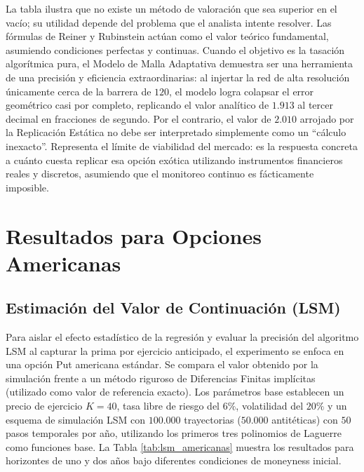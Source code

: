 La tabla ilustra que no existe un método de valoración que sea superior en el vacío; su utilidad depende del problema que el analista intente resolver. Las fórmulas de Reiner y Rubinstein actúan como el valor teórico fundamental, asumiendo condiciones perfectas y continuas. Cuando el objetivo es la tasación algorítmica pura, el Modelo de Malla Adaptativa demuestra ser una herramienta de una precisión y eficiencia extraordinarias: al injertar la red de alta resolución únicamente cerca de la barrera de $120$, el modelo logra colapsar el error geométrico casi por completo, replicando el valor analítico de $1.913$ al tercer decimal en fracciones de segundo.
Por el contrario, el valor de $2.010$ arrojado por la Replicación Estática no debe ser interpretado simplemente como un ``cálculo inexacto''. Representa el límite de viabilidad del mercado: es la respuesta concreta a cuánto cuesta replicar esa opción exótica utilizando instrumentos financieros reales y discretos, asumiendo que el monitoreo continuo es fácticamente imposible.

\section{Resultados para Opciones Americanas}
\label{sec:resultados_americanas}

\subsection{Estimación del Valor de Continuación (LSM)}

Para aislar el efecto estadístico de la regresión y evaluar la precisión del algoritmo LSM al capturar la prima por ejercicio anticipado, el experimento se enfoca en una opción Put americana estándar. Se compara el valor obtenido por la simulación frente a un método riguroso de Diferencias Finitas implícitas (utilizado como valor de referencia exacto).
Los parámetros base establecen un precio de ejercicio $K=40$, tasa libre de riesgo del $6\%$, volatilidad del $20\%$ y un esquema de simulación LSM con $100.000$ trayectorias ($50.000$ antitéticas) con $50$ pasos temporales por año, utilizando los primeros tres polinomios de Laguerre como funciones base. La Tabla \ref{tab:lsm_americanas} muestra los resultados para horizontes de uno y dos años bajo diferentes condiciones de moneyness inicial.

